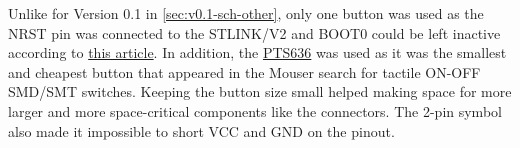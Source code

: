 Unlike for Version 0.1 in \autoref{sec:v0.1-sch-other}, only one button was used as the NRST pin was connected to the STLINK/V2 and BOOT0 could be left inactive according to \href{https://community.st.com/t5/stm32-mcus-boards-and-hardware/confused-over-correct-connections-for-boot0-nrst-and-swd/td-p/61611}{this article}. In addition, the \href{https://au.mouser.com/c/electromechanical/switches/tactile-switches/?illuminated=Non-Illuminated&mounting%20direction=Straight&mounting%20style=SMD%2FSMT&series=PTS636&switch%20function=OFF%20-%20%28ON%29&termination%20style=SMD%2FSMT&instock=y}{PTS636} was used as it was the smallest and cheapest button that appeared in the Mouser search for tactile ON-OFF SMD/SMT switches. Keeping the button size small helped making space for more larger and more space-critical components like the connectors. The 2-pin symbol also made it impossible to short VCC and GND on the pinout.